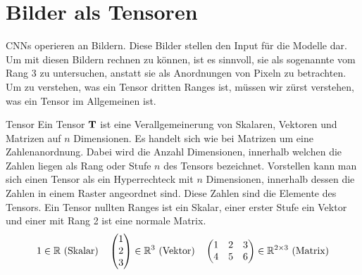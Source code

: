 \section{Bilder als Tensoren}\label{sec:tensor}
CNNs operieren an Bildern. Diese Bilder stellen den Input für die Modelle dar.
Um mit diesen Bildern rechnen zu können, ist es sinnvoll, sie als sogenannte
 vom Rang 3 zu untersuchen, anstatt sie als Anordnungen von
Pixeln zu betrachten. \\
Um zu verstehen, was ein Tensor dritten Ranges ist, müssen wir zürst verstehen, was ein Tensor im Allgemeinen ist.

\begin{defbox}{Tensor}
  Ein Tensor $\mathbf{T}$ ist eine Verallgemeinerung von Skalaren, Vektoren und Matrizen auf
  $n$ Dimensionen. Es handelt sich wie bei Matrizen um
  eine Zahlenanordnung. Dabei wird die Anzahl Dimensionen, innerhalb welchen die
  Zahlen liegen als Rang oder Stufe $n$ des Tensors bezeichnet. Vorstellen kann man sich einen Tensor
  als ein Hyperrechteck mit $n$ Dimensionen, innerhalb dessen die Zahlen in
  einem Raster angeordnet sind. Diese Zahlen sind die Elemente des Tensors.
  Ein Tensor nullten Ranges ist ein Skalar, einer erster Stufe ein Vektor und
  einer mit Rang 2 ist eine normale Matrix.
  \begin{gather*}
    1 \in \mathbb{R} \text{ (Skalar)} \quad \begin{pmatrix} 1 \\ 2 \\ 3 \end{pmatrix}
    \in \mathbb{R}^3 \text{ (Vektor)} \quad
    \begin{pmatrix}
      1 & 2 & 3 \\
      4 & 5 & 6 \\
    \end{pmatrix} \in \mathbb{R}^{2 \times 3} \text{ (Matrix)}
  \end{gather*}
\end{defbox}

